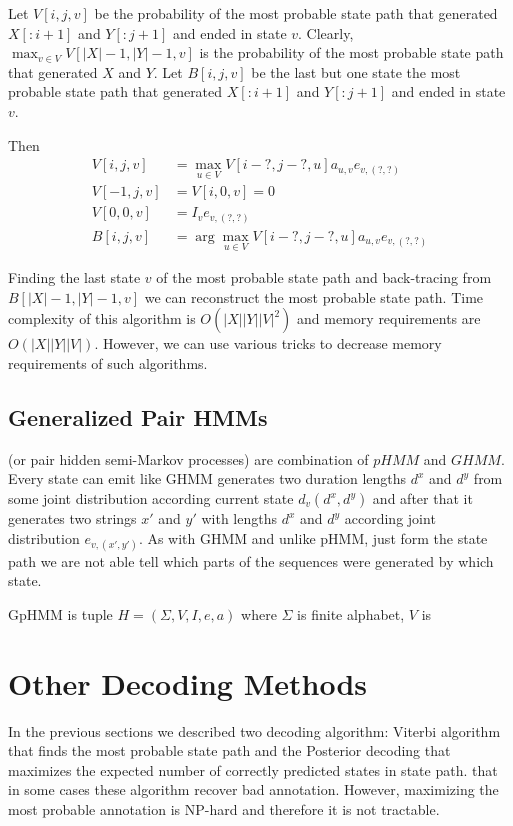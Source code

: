 Let $V[i,j,v]$ be the probability of the most probable state path that generated
$X[:i+1]$ and $Y[:j+1]$ and ended in state $v$. Clearly, $\max_{v\in
V}V[|X|-1,|Y|-1,v]$ is the probability of the most probable state path that
generated $X$ and $Y$. Let $B[i,j,v]$ be the last but one state the most
probable state path that generated $X[:i+1]$ and $Y[:j+1]$ and ended in state
$v$.

Then
\begin{align}
V[i,j,v] &= \max_{u\in V}V[i-?,j-?,u]a_{u,v}e_{v,(?,?)}\\
V[-1,j,v] &= V[i,0,v] = 0 \\
V[0,0,v] &= I_{v}e_{v,(?,?)} \\
B[i,j,v] &= \arg\max_{u\in V}V[i-?,j-?,u]a_{u,v}e_{v,(?,?)}
\end{align}

Finding the last state $v$ of the most probable state path and back-tracing from
$B[|X|-1,|Y|-1,v]$ we can reconstruct the most probable state path. Time
complexity of this algorithm is $O(|X||Y||V|^2)$ and memory requirements are
$O(|X||Y||V|)$. However, we can use various tricks to decrease memory
requirements of such algorithms.

\subsection{Generalized Pair HMMs}


 (or pair hidden semi-Markov
processes) are combination of $pHMM$ and $GHMM$.  Every state can emit like GHMM
generates two duration lengths $d^x$ and $d^y$ from some joint distribution
according current state $d_v(d^x,d^y)$ and after that it generates two strings
$x'$ and $y'$ with lengths $d^x$ and $d^y$ according joint distribution
$e_{v,(x',y')}$.  As with GHMM and unlike pHMM, just form the state path we are
not able tell which parts of the sequences were generated by which state. 

\begin{definition}
GpHMM is tuple $H=(\Sigma,V,I,e,a)$ where $\Sigma$ is finite alphabet, $V$ is 
\end{definition}

\section{Other Decoding Methods}
In the previous sections we described two decoding algorithm: Viterbi algorithm
that finds the most probable state path  and the Posterior decoding that
maximizes the expected number of correctly predicted states in state path.
 that in some cases these algorithm
recover bad annotation. However, maximizing the most probable annotation is
NP-hard and therefore it is not tractable.

